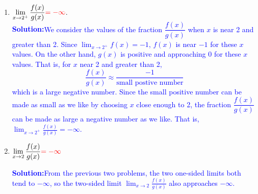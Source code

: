 \documentclass[letterpaper,11pt]{article}
\def\ds{\displaystyle}
\newcommand{\tsol}[1]{\textcolor{red}{#1}}
\newcommand{\sol}[1]{\textcolor{blue}{\textbf{Solution:}}\quad \textcolor{blue}{#1}}
\newcommand{\tsol}[1]{\textcolor{white}{#1}}
\newcommand{\sol}[1]{\vfill}
\begin{document}
\begin{enumerate}
\sol{We start by applying the limit law for quotients (provisionally):
\[
  \lim_{x \to 2^-} \frac{f(x)}{g(x)} = \frac{\lim\limits_{x \to 2^-} f(x)}{\lim\limits_{x \to 2^-} g(x)}
\]
However, $\ds \lim_{x \to 2^-} g(x) = 0$, so the limit law does not apply. We are forced to reason about the
limit another way.\\
So we consider the values of the fraction $\dfrac{f(x)}{g(x)}$ when $x$ is near $2$ and less than $2$. Since
$\ds \lim_{x \to 2^-} f(x) = 1$, $f(x)$ should be close to 1 for these $x$ values. On the other hand, $g(x)$ is negative and
approaching 0 for these $x$ values. That is, for $x$ near 2 and less than 2,
\[
   \frac{f(x)}{g(x)} \approx \frac{1}{\text{small negative number}}
\]
which is a large negative number.
Since the small negative number can be made as small as we like by choosing $x$ close enough to 2, the fraction $\dfrac{f(x)}{g(x)}$ can be made as large a negative number as we like. That is, $\ds \lim_{x \to 2^-} \frac{f(x)}{g(x)} = -\infty$.
}

\item $\ds \lim_{x\rightarrow 2^+} \frac{f(x)}{g(x)}\tsol{=-\infty}$.\\
\sol{We consider the values of the fraction $\dfrac{f(x)}{g(x)}$ when $x$ is near 2 and greater than 2. Since
$\ds\lim_{x \to 2^+} f(x) = -1$, $f(x)$ is near $-1$ for these $x$ values. On the other hand, $g(x)$ is positive and approaching
0 for these $x$ values. That is, for $x$ near 2 and greater than 2,
\[
  \frac{f(x)}{g(x)} \approx \frac{-1}{\text{small postive number}}
\]
which is a large negative number. Since the small positive number can be made as small as we like by choosing $x$
close enough to 2, the fraction $\dfrac{f(x)}{g(x)}$ can be made as large a negative number as we like. That is,
$\ds \lim_{x \to 2^+} \frac{f(x)}{g(x)} = -\infty$.
}

\item $\ds \lim_{x\rightarrow 2} \frac{f(x)}{g(x)}\tsol{=-\infty}$

\sol{From the previous two problems, the two one-sided limits both tend to $-\infty$, so the two-sided limit $\ds \lim_{x \to 2} \frac{f(x)}{g(x)}$ also approaches $-\infty$.
}

\end{enumerate}
\end{document}
